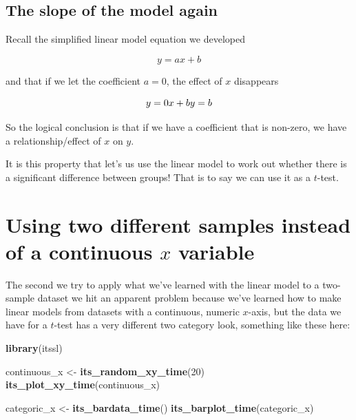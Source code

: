 \documentclass[
]{book}
\newenvironment{Shaded}{\begin{snugshade}}{\end{snugshade}}
\newcommand{\DecValTok}[1]{\textcolor[rgb]{0.00,0.00,0.81}{#1}}
\newcommand{\KeywordTok}[1]{\textcolor[rgb]{0.13,0.29,0.53}{\textbf{#1}}}
\newcommand{\NormalTok}[1]{#1}
\newcommand{\StringTok}[1]{\textcolor[rgb]{0.31,0.60,0.02}{#1}}
\begin{document}
\hypertarget{the-slope-of-the-model-again}{%
\subsection{The slope of the model again}\label{the-slope-of-the-model-again}}

Recall the simplified linear model equation we developed

\begin{equation}
y = ax + b
\end{equation}

and that if we let the coefficient \(a = 0\), the effect of \(x\) disappears

\begin{equation}
y = 0 x + b\\
y = b
\end{equation}

So the logical conclusion is that if we have a coefficient that is non-zero, we have a relationship/effect of \(x\) on \(y\).

It is this property that let's us use the linear model to work out whether there is a significant difference between groups! That is to say we can use it as a \(t\)-test.

\hypertarget{using-two-different-samples-instead-of-a-continuous-x-variable}{%
\section{\texorpdfstring{Using two different samples instead of a continuous \(x\) variable}{Using two different samples instead of a continuous x variable}}\label{using-two-different-samples-instead-of-a-continuous-x-variable}}

The second we try to apply what we've learned with the linear model to a two-sample dataset we hit an apparent problem because we've learned how to make linear models from datasets with a continuous, numeric \(x\)-axis, but the data we have for a \(t\)-test has a very different two category look, something like these here:

\begin{Shaded}
\begin{Highlighting}[]
\KeywordTok{library}\NormalTok{(itssl)}

\NormalTok{continuous_x <-}\StringTok{ }\KeywordTok{its_random_xy_time}\NormalTok{(}\DecValTok{20}\NormalTok{)}
\KeywordTok{its_plot_xy_time}\NormalTok{(continuous_x)}

\NormalTok{categoric_x <-}\StringTok{ }\KeywordTok{its_bardata_time}\NormalTok{()}
\KeywordTok{its_barplot_time}\NormalTok{(categoric_x)}
\end{Highlighting}
\end{Shaded}
\end{document}
